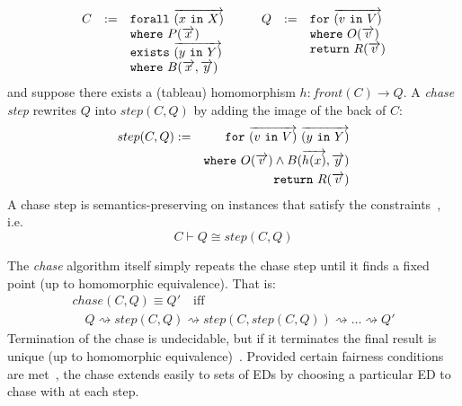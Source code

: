 \documentclass{sigplanconf}
\newcommand{\FOR}{{\tt for}\relax\ifmmode\ \else\xspace\fi}
\newcommand{\FORALL}{{\tt forall}\relax\ifmmode\ \else\xspace\fi}
\newcommand{\EXISTS}{{\tt exists}\relax\ifmmode\ \else\xspace\fi}
\newcommand{\WHERE}{{\tt where}\relax\ifmmode\ \else\xspace\fi}
\newcommand{\IN}{ \ {\tt in} \ }
\newcommand{\RETURN}{{\tt return}\relax\ifmmode\ \else\xspace\fi}
\begin{document}
\[
\begin{array}{ccc} %
\begin{array}[t]{rcl}
 C & := & \FORALL \overrightarrow{(x \IN X)} \\
 & & \WHERE P(\overrightarrow{x}) \\
 & & \EXISTS \overrightarrow{(y \IN Y)} \\
 & & \WHERE B(\overrightarrow{x}, \overrightarrow{y})
\end{array} & &
\begin{array}[t]{rcl}
Q & := & \FOR \overrightarrow{(v \IN V)} \\
 & & \WHERE  O(\overrightarrow{v}) \\ 
 & & \RETURN R(\overrightarrow{v})
\end{array}
\end{array}
\]
and suppose there exists a (tableau) homomorphism $h : front(C) \to Q$.
A \emph{chase step} rewrites $Q$ into $step(C,Q)$ by adding the image of the back of $C$:
\begin{eqnarray*}
step(C,Q) & := & \FOR \overrightarrow{(v \IN V)} \ \overrightarrow{(y \IN Y)} \\
 & & \WHERE  O(\overrightarrow{v}) \wedge B(\overrightarrow{h(x)}, \overrightarrow{y}) 
\\
 & & \RETURN R(\overrightarrow{v})
\end{eqnarray*}
A chase step is semantics-preserving on instances that satisfy the constraints~\cite{Popa99anequational}, i.e.
\[
C \vdash Q \cong step(C,Q)
\]

The {\it chase} algorithm itself simply repeats the chase step until it finds a fixed point (up to homomorphic equivalence).
That is:
\[\begin{array}{l}
chase(C,Q) \equiv Q' \quad \textrm{iff} \\
\quad Q \rightsquigarrow step(C, Q) \rightsquigarrow step(C, step(C, Q)) \rightsquigarrow \ldots \rightsquigarrow Q'
\end{array}
\]
Termination of the chase is undecidable, but if it terminates the final result is unique (up to homomorphic equivalence)~\cite{Deutsch:2006:QRC:1121995.1122010}.  Provided certain fairness conditions are met~\cite{Deutsch:2006:QRC:1121995.1122010}, the chase extends easily to sets of EDs by choosing a particular ED to chase with at each step.
\end{document}
